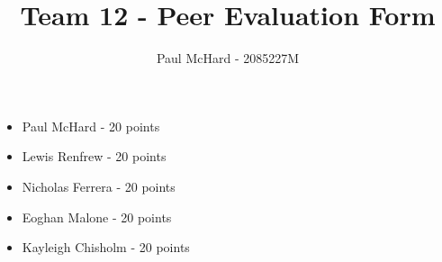 \documentclass[12pt]{article}
\title{Team 12 - Peer Evaluation Form}
\author{Paul McHard - 2085227M}
\date{}
\begin{document}
\maketitle
\begin{itemize}
\item{Paul McHard - 20 points}
\item{Lewis Renfrew - 20 points}
\item{Nicholas Ferrera - 20 points}
\item{Eoghan Malone - 20 points}
\item{Kayleigh Chisholm - 20 points}
\end{itemize}
\end{document}
